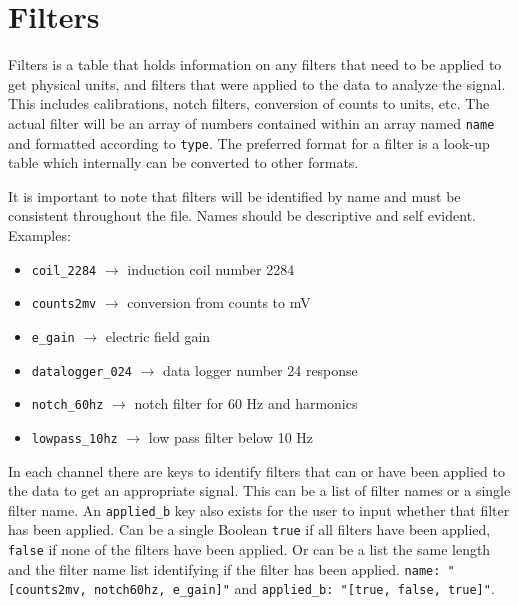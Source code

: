 \documentclass{article}
\begin{document}
\newpage
\section{Filters}

Filters is a table that holds information on any filters that need to be applied to get physical units, and filters that were applied to the data to analyze the signal.  This includes calibrations, notch filters, conversion of counts to units, etc. The actual filter will be an array of numbers contained within an array named \verb|name| and formatted according to \verb|type|. The preferred format for a filter is a look-up table which internally can be converted to other formats. 

It is important to note that filters will be identified by name and must be consistent throughout the file. Names should be descriptive and self evident. Examples:
\begin{itemize}
    \item \verb|coil_2284| $\longrightarrow$ induction coil number 2284
    \item \verb|counts2mv| $\longrightarrow$ conversion from counts to mV
    \item \verb|e_gain| $\longrightarrow$ electric field gain 
    \item \verb|datalogger_024| $\longrightarrow$ data logger number 24 response
    \item \verb|notch_60hz| $\longrightarrow$ notch filter for 60 Hz and harmonics
    \item \verb|lowpass_10hz| $\longrightarrow$ low pass filter below 10 Hz
\end{itemize}

In each channel there are keys to identify filters that can or have been applied to the data to get an appropriate signal.  This can be a list of filter names or a single filter name.  An \verb|applied_b| key also exists for the user to input whether that filter has been applied.  Can be a single Boolean \verb|true| if all filters have been applied, \verb|false| if none of the filters have been applied.  Or can be a list the same length and the filter name list identifying if the filter has been applied.  \verb|name: "[counts2mv, notch60hz, e_gain]"| and \verb|applied_b: "[true, false, true]"|. 
\end{document}
